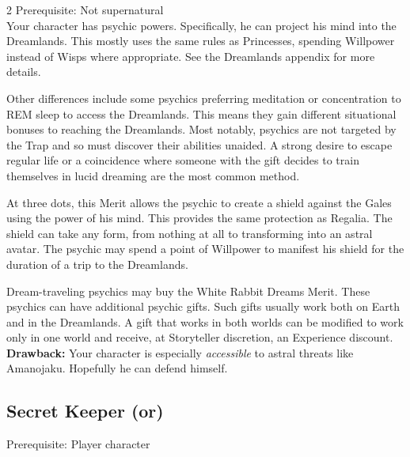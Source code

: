 \begin{multicols}{2}
Prerequisite: Not supernatural\\

\noindent Your character has psychic powers. Specifically, he can project his mind into the Dreamlands. This mostly uses the same rules as Princesses, spending Willpower instead of Wisps where appropriate. See the Dreamlands appendix for more details. 

Other differences include some psychics preferring meditation or concentration to REM sleep to access the Dreamlands. This means they gain different situational bonuses to reaching the Dreamlands. Most notably, psychics are not targeted by the Trap and so must discover their abilities unaided. A strong desire to escape regular life or a coincidence where someone with the gift decides to train themselves in lucid dreaming are the most common method. 

At three dots, this Merit allows the psychic to create a shield against the Gales using the power of his mind. This provides the same protection as Regalia. The shield can take any form, from nothing at all to transforming into an astral avatar. The psychic may spend a point of Willpower to manifest his shield for the duration of a trip to the Dreamlands. 

Dream-traveling psychics may buy the White Rabbit Dreams Merit. These psychics can have additional psychic gifts. Such gifts usually work both on Earth and in the Dreamlands. A gift that works in both worlds can be modified to work only in one world and receive, at Storyteller discretion, an Experience discount. \\

\textbf{Drawback:} Your character is especially \textit{accessible} to astral threats like Amanojaku. Hopefully he can defend himself.

\subsection*{Secret Keeper (\textbullet\textbullet\nobreak\hspace{.16667em}or\nobreak\hspace{.16667em}\textbullet\textbullet\textbullet)}

Prerequisite: Player character\\


\end{multicols}
